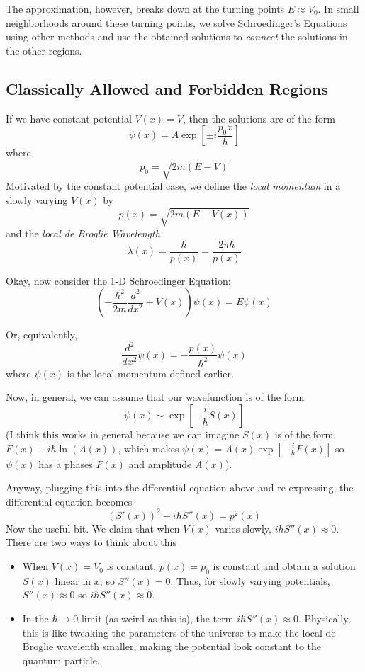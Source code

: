 \documentclass{article}
\begin{document}
\vskip 0.5cm
The approximation, however, breaks down at the turning points $E \approx V_0$. In small neighborhoods around these turning points, we solve Schroedinger's Equations using other methods and use the obtained solutions to \emph{connect} the solutions in the other regions.

\vskip 1cm
\subsection{Classically Allowed and Forbidden Regions}

If we have constant potential $V(x) = V$, then the solutions are of the form 
\[ \psi(x) = A \exp\left[\pm i \frac{p_0 x}{\hbar}\right] \] where 
\[ p_0 = \sqrt{2m(E-V)}\] Motivated by the constant potential case, we define the \emph{local momentum} in a slowly varying $V(x)$ by
\[ p(x) = \sqrt{2m(E-V(x))} \] and the \emph{local de Broglie Wavelength}
\[ \lambda(x) = \frac{h}{p(x)} = \frac{2\pi \hbar}{p(x)} \]

\vskip 0.5cm
Okay, now consider the 1-D Schroedinger Equation:
\[ \left(-\frac{\hbar^2}{2m} \frac{d^2}{dx^2} + V(x)\right) \psi(x) = E \psi(x)  \]

\vskip 0.5cm
Or, equivalently, 
\[ \boxed{\frac{d^2}{dx^2} \psi(x) = -\frac{p(x)}{\hbar^2} \psi(x) } \]where $\psi(x)$ is the local momentum defined earlier.

\vskip 0.5cm
Now, in general, we can assume that our wavefunction is of the form \[ \psi(x) \sim \exp\left[-\frac{i}{\hbar} S(x) \right] \](I think this works in general because we can imagine $S(x)$ is of the form $F(x) - i\hbar\ln(A(x))$, which makes $\psi(x) = A(x)\exp\left[ -\frac{i}{\hbar} F(x) \right]$ so $\psi(x)$ has a phases $F(x)$ and amplitude $A(x)$). 

\vskip 0.5cm
Anyway, plugging this into the dfferential equation above and re-expressing, the differential equation becomes \[  \boxed{\left(S'(x)\right)^2 - i\hbar S''(x) = p^2(x) } \] Now the useful bit. We claim that when $V(x)$ varies slowly, $ihS''(x) \approx 0$. There are two ways to think about this 
\begin{itemize}
  \item When $V(x) = V_0$ is constant, $p(x) = p_0$ is constant and obtain a solution $S(x)$ linear in $x$, so $S''(x) = 0$. Thus, for slowly varying potentials, $S''(x) \approx 0$ so $i\hbar S''(x) \approx 0$.
  \item In the $\hbar \rightarrow 0$ limit (as weird as this is), the term $i\hbar S''(x) \approx 0$. Physically, this is like tweaking the parameters of the universe to make the local de Broglie wavelenth smaller, making the potential look constant to the quantum particle.
\end{itemize}
\end{document}
